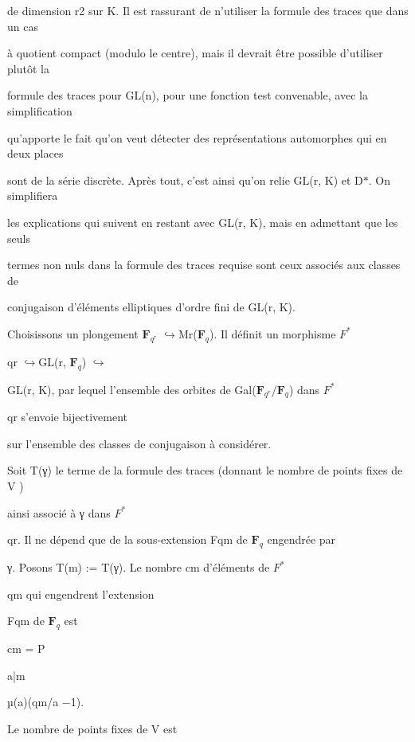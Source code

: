\documentclass[11pt]{article}
\begin{document}
\noindent de dimension r2 sur K. Il est rassurant de n’utiliser la formule des traces que dans un cas\par
\medskip
\noindent à quotient compact (modulo le centre), mais il devrait être possible d’utiliser plutôt la\par
\noindent formule des traces pour GL(n), pour une fonction test convenable, avec la simplification\par
\noindent qu’apporte le fait qu’on veut détecter des représentations automorphes qui en deux places\par
\noindent sont de la série discrète. Après tout, c’est ainsi qu’on relie GL(r, K) et D\(*\). On simplifiera\par
\noindent les explications qui suivent en restant avec GL(r, K), mais en admettant que les seuls\par
\noindent termes non nuls dans la formule des traces requise sont ceux associés aux classes de\par
\noindent conjugaison d’éléments elliptiques d’ordre fini de GL(r, K).\par
\noindent Choisissons un plongement \(\mathbf F_{q^r}\) \(\hookrightarrow\)Mr(\(\mathbf F_q\)). Il définit un morphisme \(F^*\)\par
\noindent qr \(\hookrightarrow\)GL(r, \(\mathbf F_q\)) \(\hookrightarrow\)\par
\noindent GL(r, K), par lequel l’ensemble des orbites de Gal(\(\mathbf F_{q^r}\)/\(\mathbf F_q\)) dans \(F^*\)\par
\noindent qr s’envoie bijectivement\par
\noindent sur l’ensemble des classes de conjugaison à considérer.\par
\noindent Soit T(γ) le terme de la formule des traces (donnant le nombre de points fixes de V )\par
\noindent ainsi associé à γ dans \(F^*\)\par
\noindent qr. Il ne dépend que de la sous-extension Fqm de \(\mathbf F_q\) engendrée par\par
\noindent γ. Posons T(m) := T(γ). Le nombre cm d’éléments de \(F^*\)\par
\noindent qm qui engendrent l’extension\par
\noindent Fqm de \(\mathbf F_q\) est\par
\noindent cm = P\par
\noindent a|m\par
\noindent µ(a)(qm/a −1).\par
\noindent Le nombre de points fixes de V est\par
\end{document}

